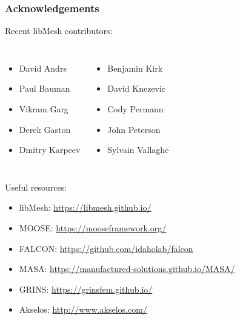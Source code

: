 \begin{frame}
\frametitle{Acknowledgements}

Recent libMesh contributors:
\begin{columns}


\begin{itemize}
\item David Andrs
\item Paul Bauman
\item Vikram Garg
\item Derek Gaston
\item Dmitry Karpeev
\end{itemize}

\begin{itemize}
\item Benjamin Kirk
\item David Knezevic
\item Cody Permann
\item John Peterson
\item Sylvain Vallaghe
\end{itemize}

\end{columns}

\vspace{5mm}

Useful resources:
\begin{itemize}
\item libMesh: \url{https://libmesh.github.io/}
\item MOOSE: \url{https://mooseframework.org/}
\item FALCON: \url{https://github.com/idaholab/falcon}
\item MASA: \url{https://manufactured-solutions.github.io/MASA/}
\item GRINS: \url{https://grinsfem.github.io/}
\item Akselos: \url{http://www.akselos.com/}
\end{itemize}


\end{frame}


